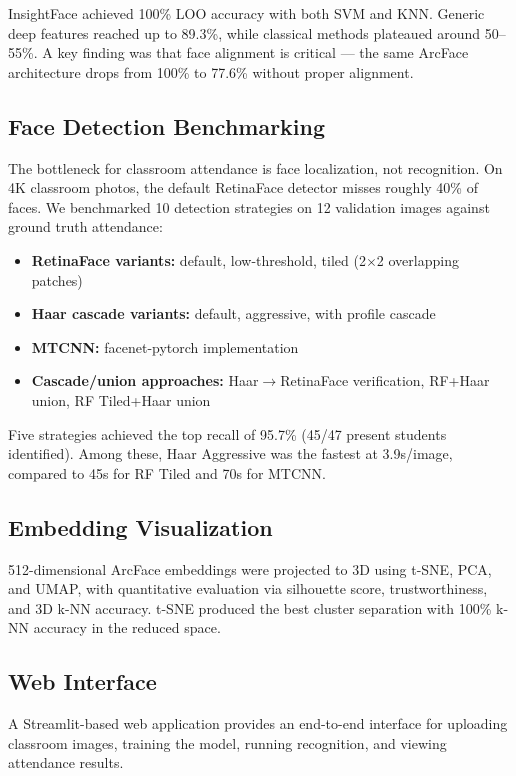 \documentclass[12pt,a4paper]{article}
\begin{document}
InsightFace achieved 100\% LOO accuracy with both SVM and KNN. Generic deep features reached up to 89.3\%, while classical methods plateaued around 50--55\%. A key finding was that face alignment is critical --- the same ArcFace architecture drops from 100\% to 77.6\% without proper alignment.

\subsection{Face Detection Benchmarking}
The bottleneck for classroom attendance is face localization, not recognition. On 4K classroom photos, the default RetinaFace detector misses roughly 40\% of faces. We benchmarked 10 detection strategies on 12 validation images against ground truth attendance:

\begin{itemize}[nosep]
    \item \textbf{RetinaFace variants:} default, low-threshold, tiled (2$\times$2 overlapping patches)
    \item \textbf{Haar cascade variants:} default, aggressive, with profile cascade
    \item \textbf{MTCNN:} facenet-pytorch implementation
    \item \textbf{Cascade/union approaches:} Haar$\rightarrow$RetinaFace verification, RF+Haar union, RF Tiled+Haar union
\end{itemize}

Five strategies achieved the top recall of 95.7\% (45/47 present students identified). Among these, Haar Aggressive was the fastest at 3.9s/image, compared to 45s for RF Tiled and 70s for MTCNN.

\subsection{Embedding Visualization}
512-dimensional ArcFace embeddings were projected to 3D using t-SNE, PCA, and UMAP, with quantitative evaluation via silhouette score, trustworthiness, and 3D k-NN accuracy. t-SNE produced the best cluster separation with 100\% k-NN accuracy in the reduced space.

\subsection{Web Interface}
A Streamlit-based web application provides an end-to-end interface for uploading classroom images, training the model, running recognition, and viewing attendance results.
\end{document}
